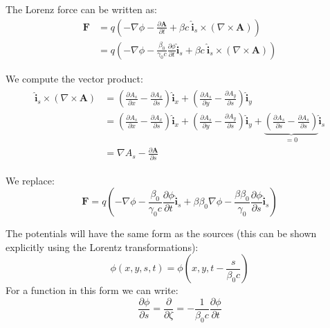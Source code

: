 The Lorenz force can be written as:
\begin{equation}
\begin{split}
\textbf{F} &=q \left( -\nabla \phi -\frac{\partial \textbf{A}}{\partial t}
 + \beta c \ \hat{\textbf{i}}_s \times {\left(\nabla \times \textbf{A} \right)} \right)\\
 &=q \left( -\nabla \phi -\frac{\beta_0}{\gamma_0 c}\frac{\partial \phi}{\partial t}\hat{\textbf{i}}_s
 + \beta c \ \hat{\textbf{i}}_s \times {\left(\nabla \times \textbf{A} \right)} \right)
 \end{split}
\end{equation}

We compute the vector product:
\begin{align}
\begin{split}
\hat{\textbf{i}}_s \times \left(\nabla \times \textbf{A}\right) &= \left(\frac{\partial A_s}{\partial x} - \frac{\partial A_x}{\partial s} \right) \hat{\textbf{i}}_x + \left(\frac{\partial A_s}{\partial y} - \frac{\partial A_y}{\partial s} \right) \hat{\textbf{i}}_y\\
 &= \left(\frac{\partial A_s}{\partial x} - \frac{\partial A_x}{\partial s} \right) \hat{\textbf{i}}_x + \left(\frac{\partial A_s}{\partial y} - \frac{\partial A_y}{\partial s} \right) \hat{\textbf{i}}_y + \underbrace{\left(\frac{\partial A_s}{\partial s} - \frac{\partial A_s}{\partial s} \right)}_{=0} \hat{\textbf{i}}_s\\
 &= \nabla A_s - \frac{\partial \textbf{A}}{\partial s} 
\end{split} 
\end{align}

We replace:
\begin{equation}
\textbf{F} 
=q \left( -\nabla \phi -\frac{\beta_0}{\gamma_0 c}\frac{\partial \phi}{\partial t}\hat{\textbf{i}}_s
 + \beta  \beta_0\nabla \phi - \frac{\beta \beta_0}{\gamma_0} \frac{\partial \phi}{\partial s} \hat{\textbf{i}}_s
  \right)
\end{equation}

The potentials will have the same form as the sources (this can be shown explicitly using the Lorentz transformations):
\begin{equation}
\phi(x, y, s, t) = \phi\left(x, y, t - \frac{s}{\beta_0 c}\right)
\end{equation}
For a function in this form we can write:
\begin{equation}
 \frac{\partial \phi}{\partial s} = 
\frac{\partial}{\partial\zeta} 
 = -\frac{1}{\beta_0 c}\frac{\partial \phi}{\partial t} \label{derder}
\end{equation}


